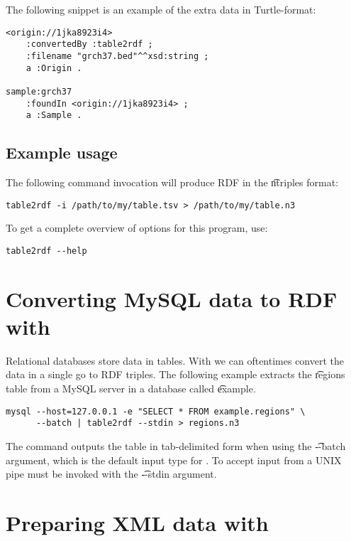   The following snippet is an example of the extra data in Turtle-format:

\begin{lstlisting}
<origin://1jka8923i4>
    :convertedBy :table2rdf ;
    :filename "grch37.bed"^^xsd:string ;
    a :Origin .

sample:grch37
    :foundIn <origin://1jka8923i4> ;
    a :Sample .
\end{lstlisting}

\subsection{Example usage}

The following command invocation will produce RDF in the \t{ntriples}
format:

\begin{lstlisting}
table2rdf -i /path/to/my/table.tsv > /path/to/my/table.n3
\end{lstlisting}

To get a complete overview of options for this program, use:

\begin{lstlisting}
table2rdf --help
\end{lstlisting}

\section{Converting MySQL data to RDF with }

  Relational databases store data in tables.  With  we
  can oftentimes convert the data in a single go to RDF triples.  The following
  example extracts the \t{regions} table from a MySQL server in a database
  called \t{example}.

\begin{lstlisting}
mysql --host=127.0.0.1 -e "SELECT * FROM example.regions" \
      --batch | table2rdf --stdin > regions.n3
\end{lstlisting}

  The  command outputs the table in tab-delimited form when using
  the \t{-{}-batch} argument, which is the default input type for
  .  To accept input from a UNIX pipe \program{table2rdf} must
  be invoked with the \t{-{}-stdin} argument.

\section{Preparing XML data with }
\label{sec:xml2rdf}

